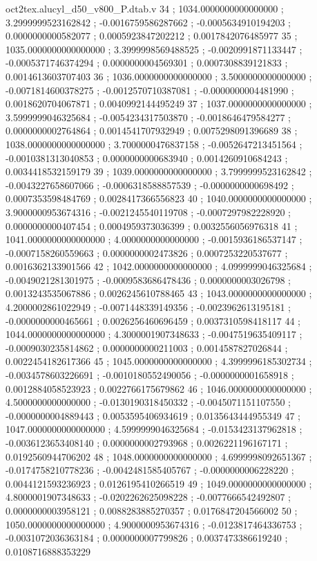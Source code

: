 \begin{filecontents}[overwrite]{oct2tex.alucyl_d50_v800_P.dtab.v}
34 ; 1034.0000000000000000 ; 3.2999999523162842 ; -0.0016759586287662 ; -0.0005634910194203 ; 0.0000000000582077 ; 0.0005923847202212 ; 0.0017842076485977
35 ; 1035.0000000000000000 ; 3.3999998569488525 ; -0.0020991871133447 ; -0.0005371746374294 ; 0.0000000004569301 ; 0.0007308839121833 ; 0.0014613603707403
36 ; 1036.0000000000000000 ; 3.5000000000000000 ; -0.0071814600378275 ; -0.0012570710387081 ; -0.0000000004481990 ; 0.0018620704067871 ; 0.0040992144495249
37 ; 1037.0000000000000000 ; 3.5999999046325684 ; -0.0054234317503870 ; -0.0018646479584277 ; 0.0000000002764864 ; 0.0014541707932949 ; 0.0075298091396689
38 ; 1038.0000000000000000 ; 3.7000000476837158 ; -0.0052647213451564 ; -0.0010381313040853 ; 0.0000000000683940 ; 0.0014260910684243 ; 0.0034418532159179
39 ; 1039.0000000000000000 ; 3.7999999523162842 ; -0.0043227658607066 ; -0.0006318588857539 ; -0.0000000000698492 ; 0.0007353598484769 ; 0.0028417366556823
40 ; 1040.0000000000000000 ; 3.9000000953674316 ; -0.0021245540119708 ; -0.0007297982228920 ; 0.0000000000407454 ; 0.0004959373036399 ; 0.0032556056976318
41 ; 1041.0000000000000000 ; 4.0000000000000000 ; -0.0015936186537147 ; -0.0007158260559663 ; 0.0000000002473826 ; 0.0007253220537677 ; 0.0016362133901566
42 ; 1042.0000000000000000 ; 4.0999999046325684 ; -0.0049021281301975 ; -0.0009583686478436 ; 0.0000000003026798 ; 0.0013243535067886 ; 0.0026245610788465
43 ; 1043.0000000000000000 ; 4.2000002861022949 ; -0.0071448339149356 ; -0.0023962613195181 ; -0.0000000000465661 ; 0.0026256460696459 ; 0.0037310598418117
44 ; 1044.0000000000000000 ; 4.3000001907348633 ; -0.0047519635409117 ; -0.0009030235814862 ; 0.0000000000211003 ; 0.0014587827026844 ; 0.0022454182617366
45 ; 1045.0000000000000000 ; 4.3999996185302734 ; -0.0034578603226691 ; -0.0010180552490056 ; -0.0000000001658918 ; 0.0012884058523923 ; 0.0022766175679862
46 ; 1046.0000000000000000 ; 4.5000000000000000 ; -0.0130190318450332 ; -0.0045071151107550 ; -0.0000000004889443 ; 0.0053595406934619 ; 0.0135643444955349
47 ; 1047.0000000000000000 ; 4.5999999046325684 ; -0.0153423137962818 ; -0.0036123653408140 ; 0.0000000002793968 ; 0.0026221196167171 ; 0.0192560944706202
48 ; 1048.0000000000000000 ; 4.6999998092651367 ; -0.0174758210778236 ; -0.0042481585405767 ; -0.0000000006228220 ; 0.0044121593236923 ; 0.0126195410266519
49 ; 1049.0000000000000000 ; 4.8000001907348633 ; -0.0202262625098228 ; -0.0077666542492807 ; 0.0000000003958121 ; 0.0088283885270357 ; 0.0176847204566002
50 ; 1050.0000000000000000 ; 4.9000000953674316 ; -0.0123817464336753 ; -0.0031072036363184 ; 0.0000000007799826 ; 0.0037473386619240 ; 0.0108716888353229

\end{filecontents}
